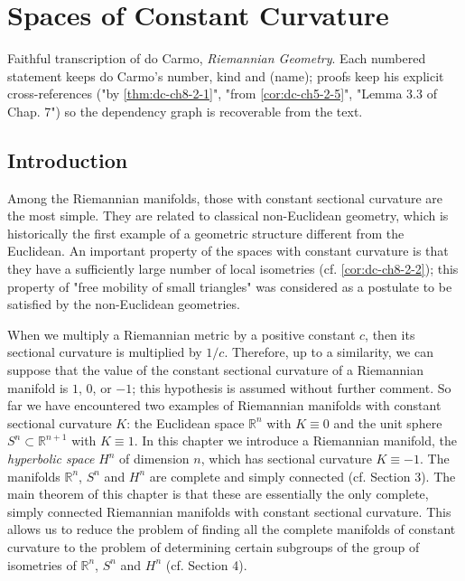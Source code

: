\chapter{Spaces of Constant Curvature}
\label{chap:dc-spaces-of-constant-curvature}

Faithful transcription of do Carmo, \emph{Riemannian Geometry}. Each numbered
statement keeps do Carmo's number, kind and (name); proofs keep his explicit
cross-references ("by \cref{thm:dc-ch8-2-1}", "from \cref{cor:dc-ch5-2-5}", "Lemma
3.3 of Chap. 7") so the dependency graph is recoverable from the text.

\section{Introduction}

Among the Riemannian manifolds, those with constant sectional curvature are the
most simple. They are related to classical non-Euclidean geometry, which is
historically the first example of a geometric structure different from the
Euclidean. An important property of the spaces with constant curvature is that
they have a sufficiently large number of local isometries (cf. \cref{cor:dc-ch8-2-2});
this property of "free mobility of small triangles" was considered as a postulate
to be satisfied by the non-Euclidean geometries.

When we multiply a Riemannian metric by a positive constant $c$, then its
sectional curvature is multiplied by $1/c$. Therefore, up to a similarity, we can
suppose that the value of the constant sectional curvature of a Riemannian
manifold is $1$, $0$, or $-1$; this hypothesis is assumed without further comment.
So far we have encountered two examples of Riemannian manifolds with constant
sectional curvature $K$: the Euclidean space $\mathbb{R}^n$ with $K\equiv 0$ and
the unit sphere $S^n\subset\mathbb{R}^{n+1}$ with $K\equiv 1$. In this chapter we
introduce a Riemannian manifold, the \emph{hyperbolic space} $H^n$ of dimension $n$,
which has sectional curvature $K\equiv -1$. The manifolds $\mathbb{R}^n$, $S^n$
and $H^n$ are complete and simply connected (cf. Section 3). The main theorem of
this chapter is that these are essentially the only complete, simply connected
Riemannian manifolds with constant sectional curvature. This allows us to reduce
the problem of finding all the complete manifolds of constant curvature to the
problem of determining certain subgroups of the group of isometries of
$\mathbb{R}^n$, $S^n$ and $H^n$ (cf. Section 4).

